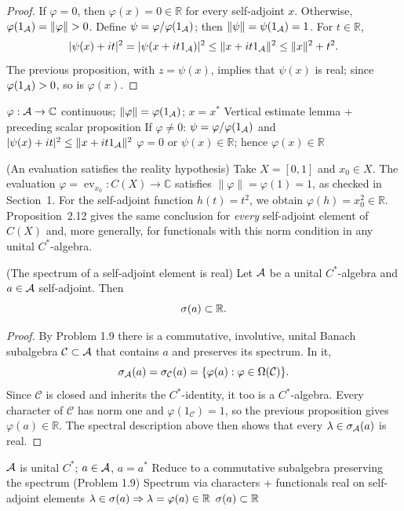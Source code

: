 \begin{proof}[Proof]
If $\varphi=0$, then $\varphi(x)=0\in\mathbb R$ for every self-adjoint $x$.
Otherwise, $\varphi(1_\A)=\|\varphi\|>0$.
Define $\psi=\varphi/\varphi(1_\mathcal A)$; then $\|\psi\|=\psi(1_\mathcal A)=1$.
For $t\in\mathbb R$,
\[
 |\psi(x)+it|^2
 =|\psi(x+it1_\mathcal A)|^2
 \le\|x+it1_\mathcal A\|^2
 \le\|x\|^2+t^2.
\]
The previous proposition, with $z=\psi(x)$, implies that $\psi(x)$ is real;
since $\varphi(1_\mathcal A)>0$, so is $\varphi(x)$.
\end{proof}

\proofdiagram
{$\varphi:\mathcal A\to\mathbb C$ continuous; $\|\varphi\|=\varphi(1_\mathcal A)$; $x=x^*$}
{Vertical estimate lemma + preceding scalar proposition}
{If $\varphi\ne0$: $\psi=\varphi/\varphi(1_\mathcal A)$ and $|\psi(x)+it|^2\le\|x+it1_\mathcal A\|^2$}
{$\varphi=0$ or $\psi(x)\in\mathbb R$; hence $\varphi(x)\in\mathbb R$}

\begin{cthejemplo}{(An evaluation satisfies the reality hypothesis)}
Take $X=[0,1]$ and $x_0\in X$. The evaluation
$\varphi=\operatorname{ev}_{x_0}:C(X)\to\mathbb C$ satisfies
$\|\varphi\|=\varphi(1)=1$, as checked in Section~1.
For the self-adjoint function $h(t)=t^2$, we obtain
$\varphi(h)=x_0^2\in\mathbb R$.
Proposition~2.12 gives the same conclusion for \emph{every} self-adjoint
element of $C(X)$ and, more generally, for functionals with this norm
condition in any unital $C^*$-algebra.
\end{cthejemplo}

\begin{cthproposicion}{(The spectrum of a self-adjoint element is real)}
Let $\mathcal A$ be a unital $C^*$-algebra and $a\in\mathcal A$ self-adjoint. Then
\[
 \sigma(a)\subset\mathbb R.
\]
\end{cthproposicion}

\begin{proof}[Proof]
By Problem 1.9 there is a commutative, involutive, unital Banach subalgebra
$\mathcal C\subset\mathcal A$ that contains $a$ and preserves its spectrum. In it,
\[
 \sigma_\mathcal A(a)=\sigma_{\mathcal C}(a)=\{\varphi(a):\varphi\in\Omega(\mathcal C)\}.
\]
Since $\mathcal C$ is closed and inherits the $C^*$-identity, it too is a
$C^*$-algebra. Every character of $\mathcal C$ has norm one and
$\varphi(1_{\mathcal C})=1$, so the previous proposition gives
$\varphi(a)\in\mathbb R$. The spectral description above then shows
that every $\lambda\in\sigma_\mathcal A(a)$ is real.
\end{proof}

\proofdiagrambranch
{$\mathcal A$ is unital $C^*$; $a\in\mathcal A$, $a=a^*$}
{Reduce to a commutative subalgebra preserving the spectrum (Problem 1.9)}
{Spectrum via characters + functionals real on self-adjoint elements}
{$\lambda\in\sigma(a)\Rightarrow\lambda=\varphi(a)\in\mathbb R$}
{$\sigma(a)\subset\mathbb R$}

